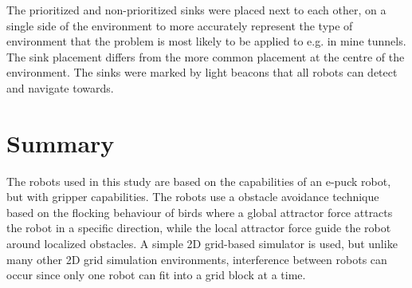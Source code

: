 The prioritized and non-prioritized sinks were placed next to each other, on a single side of the environment to more accurately represent the type of environment that the problem is most likely to be applied to e.g. in mine tunnels. The sink placement differs from the more common placement at the centre of the environment. The sinks were marked by light beacons that all robots can detect and navigate towards.


\section{Summary}
\label{robots:summary}
The robots used in this study are based on the capabilities of an e-puck robot, but with gripper capabilities. The robots use a obstacle avoidance technique based on the flocking behaviour of birds where a global attractor force attracts the robot in a specific direction, while the local attractor force guide the robot around localized obstacles. A simple 2D grid-based simulator is used, but unlike many other 2D grid simulation environments, interference between robots can occur since only one robot can fit into a grid block at a time. 
